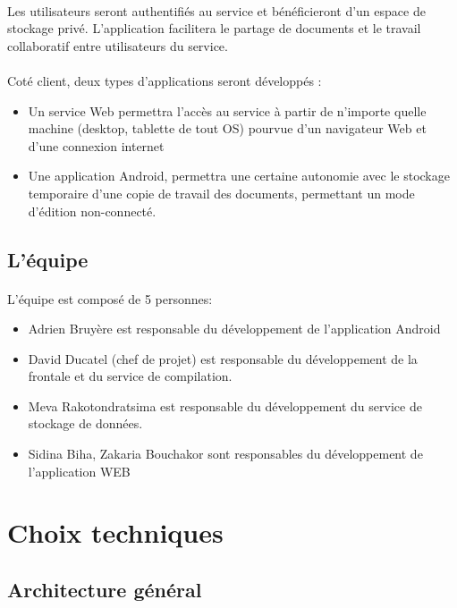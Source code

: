 \documentclass[a4paper,12pt]{article}
\begin{document}
\paragraph*{}
Les utilisateurs seront authentifiés au service et bénéficieront d'un espace
de stockage privé. L'application facilitera le partage de documents et le
travail collaboratif entre utilisateurs du service.
\paragraph*{} 
Coté client, deux types d'applications seront développés :

\begin{itemize}
 \item Un service Web permettra l'accès au service à partir de n'importe
quelle machine (desktop, tablette de tout OS) pourvue d'un navigateur
Web et d'une connexion internet

 \item Une application Android, permettra une certaine autonomie avec le
stockage temporaire d'une copie de travail des documents, permettant
un mode d'édition non-connecté.
\end{itemize}

\subsection{L'équipe}
\paragraph*{}
L'équipe est composé de 5 personnes:
\begin{itemize}
 \item Adrien Bruyère est responsable du développement de l'application Android
 \item David Ducatel (chef de projet) est responsable du développement de la frontale et du service de compilation.
 \item Meva Rakotondratsima est responsable du développement du service de stockage de données.
 \item Sidina Biha, Zakaria Bouchakor sont responsables du développement de l'application WEB
\end{itemize}

\newpage
\section{Choix techniques}
\subsection{Architecture général}
\end{document}
